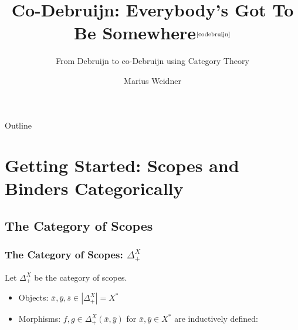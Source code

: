 \documentclass[aspectratio=169]{beamer}
\title{Co-Debruijn: Everybody's Got To Be Somewhere$^{\text{\cite{codebruijn}}}$}
\subtitle{From Debruijn to co-Debruijn using Category Theory}
\institute[Uni Freiburg]{Chair of Programming Languages, University of
  Freiburg}
\author{Marius Weidner}
\theoremstyle{remarkstyle}
\begin{document}
\begin{frame}
  \titlepage{}
\end{frame}

\begin{frame}{Outline}
  \tableofcontents
\end{frame}

\section{Getting Started: Scopes and Binders Categorically}
\subsection{The Category of Scopes}

\begin{frame}[fragile]
  \frametitle{The Category of Scopes: $Δ_+^X$}
  \begin{definition}
    Let $Δ_+^X$ be the category of scopes.
    \begin{itemize}
      \item Objects: $\bar{x}, \bar{y}, \bar{s} ∈ |Δ_+^X| = X^*$
      \item Morphisms: $f, g ∈ Δ_+^X(\bar{x}, \bar{y})$ for $\bar{x}, \bar{y} ∈ X^*$ are inductively defined:
    \end{itemize}
    \begin{columns}
      \begin{column}{0.04\textwidth}
      \end{column}
      \begin{column}{0.2\textwidth}
        \begin{center}
        \end{center}
      \end{column}
      \begin{column}{0.2\textwidth}
        \begin{center}
        \end{center}
      \end{column}
      \begin{column}{0.2\textwidth}
        \begin{center}
        \end{center}
      \end{column}

\end{columns}
\end{definition}
\end{frame}
\end{document}

